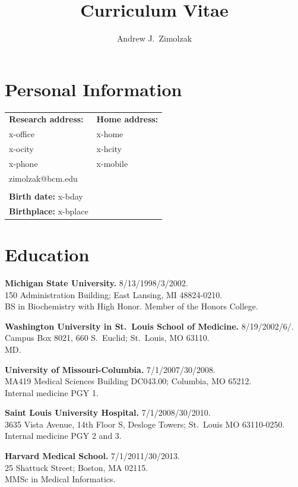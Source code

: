 \documentclass[10pt]{article}
\title{Curriculum Vitae}
\author{Andrew J.\ Zimolzak}
\begin{document}
\thispagestyle{fancy}

\section{Personal Information}

\begin{tabular}{l l}
\textbf{Research address:}  & \textbf{Home address:}\\
x-office    & x-home\\
x-ocity    & x-hcity\\
x-phone    & x-mobile\\
zimolzak@bcm.edu\\
\\
\textbf{Birth date:} x-bday\\
\textbf{Birthplace:} x-bplace
\end{tabular}



\section{Education}

\textbf{Michigan State University.} 8/13/1998/3/2002.\\
150 Administration Building; East Lansing, MI 48824-0210.\\
BS in Biochemistry with High Honor. Member of the Honors College.

\textbf{Washington University in St.\ Louis School of Medicine.}
8/19/2002\ndash{}/6/.\\
Campus Box 8021, 660 S.\ Euclid; St.\ Louis, MO 63110.\\
MD.

\textbf{University of Missouri-Columbia.} 7/1/2007/30/2008.\\
MA419 Medical Sciences Building DC043.00; Columbia, MO 65212.\\
Internal medicine PGY 1.

\textbf{Saint Louis University Hospital.} 7/1/2008/30/2010.\\
3635 Vista Avenue, 14th Floor S, Desloge Towers; St.\ Louis MO
63110-0250.\\
Internal medicine PGY 2 and 3.

\textbf{Harvard Medical School.} 7/1/2011/30/2013.\\
25 Shattuck Street; Boston, MA 02115.\\
MMSc in Medical Informatics.
\end{document}

